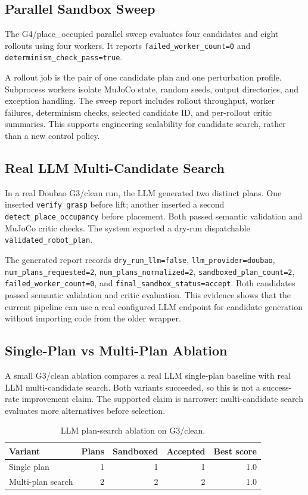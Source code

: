 \documentclass[conference]{IEEEtran}
\begin{document}
\subsection{Parallel Sandbox Sweep}
The G4/place\_occupied parallel sweep evaluates four candidates and eight rollouts using four workers. It reports \texttt{failed\_worker\_count=0} and \texttt{determinism\_check\_pass=true}.

A rollout job is the pair of one candidate plan and one perturbation profile. Subprocess workers isolate MuJoCo state, random seeds, output directories, and exception handling. The sweep report includes rollout throughput, worker failures, determinism checks, selected candidate ID, and per-rollout critic summaries. This supports engineering scalability for candidate search, rather than a new control policy.

\subsection{Real LLM Multi-Candidate Search}
In a real Doubao G3/clean run, the LLM generated two distinct plans. One inserted \texttt{verify\_grasp} before lift; another inserted a second \texttt{detect\_place\_occupancy} before placement. Both passed semantic validation and MuJoCo critic checks. The system exported a dry-run dispatchable \texttt{validated\_robot\_plan}.

The generated report records \texttt{dry\_run\_llm=false}, \texttt{llm\_provider=doubao}, \texttt{num\_plans\_requested=2}, \texttt{num\_plans\_normalized=2}, \texttt{sandboxed\_plan\_count=2}, \texttt{failed\_worker\_count=0}, and \texttt{final\_sandbox\_status=accept}. Both candidates passed semantic validation and critic evaluation. This evidence shows that the current pipeline can use a real configured LLM endpoint for candidate generation without importing code from the older wrapper.

\subsection{Single-Plan vs Multi-Plan Ablation}
A small G3/clean ablation compares a real LLM single-plan baseline with real LLM multi-candidate search. Both variants succeeded, so this is not a success-rate improvement claim. The supported claim is narrower: multi-candidate search evaluates more alternatives before selection.

\begin{table}[t]
\centering
\caption{LLM plan-search ablation on G3/clean.}
\begin{tabular}{lrrrr}
\toprule
Variant & Plans & Sandboxed & Accepted & Best score \\
\midrule
Single plan & 1 & 1 & 1 & 1.0 \\
Multi-plan search & 2 & 2 & 2 & 1.0 \\
\bottomrule
\end{tabular}
\end{table}
\end{document}
